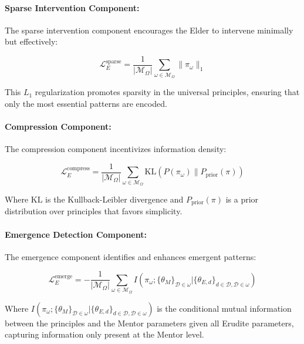 \paragraph{Sparse Intervention Component:}
The sparse intervention component encourages the Elder to intervene minimally but effectively:

\begin{equation}
\mathcal{L}_E^{\text{sparse}} = \frac{1}{|\mathcal{M}_{\Omega}|} \sum_{\omega \in \mathcal{M}_{\Omega}} \|\pi_{\omega}\|_1
\end{equation}

This $L_1$ regularization promotes sparsity in the universal principles, ensuring that only the most essential patterns are encoded.

\paragraph{Compression Component:}
The compression component incentivizes information density:

\begin{equation}
\mathcal{L}_E^{\text{compress}} = \frac{1}{|\mathcal{M}_{\Omega}|} \sum_{\omega \in \mathcal{M}_{\Omega}} \text{KL}(P(\pi_{\omega}) \| P_{\text{prior}}(\pi))
\end{equation}

Where $\text{KL}$ is the Kullback-Leibler divergence and $P_{\text{prior}}(\pi)$ is a prior distribution over principles that favors simplicity.

\paragraph{Emergence Detection Component:}
The emergence component identifies and enhances emergent patterns:

\begin{equation}
\mathcal{L}_E^{\text{emerge}} = -\frac{1}{|\mathcal{M}_{\Omega}|} \sum_{\omega \in \mathcal{M}_{\Omega}} I(\pi_{\omega}; \{\theta_{M}\}_{\mathcal{D} \in \omega} | \{\theta_{E,d}\}_{d \in \mathcal{D}, \mathcal{D} \in \omega})
\end{equation}

Where $I(\pi_{\omega}; \{\theta_{M}\}_{\mathcal{D} \in \omega} | \{\theta_{E,d}\}_{d \in \mathcal{D}, \mathcal{D} \in \omega})$ is the conditional mutual information between the principles and the Mentor parameters given all Erudite parameters, capturing information only present at the Mentor level.

